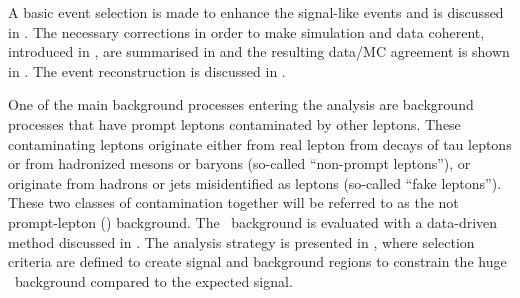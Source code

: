  A basic event selection is made to enhance the signal-like events and is discussed in . The necessary  corrections in order to make simulation and data coherent, introduced in , are summarised in  and the resulting data/MC agreement is shown in . The event reconstruction is discussed in . 
 
 One of the main background processes entering the analysis are background processes that have prompt leptons contaminated by other leptons. These contaminating leptons originate either from real lepton from decays of tau leptons or from hadronized mesons or baryons
 (so-called ``non-prompt leptons''), or originate from hadrons or jets misidentified as leptons (so-called ``fake leptons'').  These two classes  of contamination together will be referred to as the not prompt-lepton (\NPL) background. The \NPL\ background  is
 evaluated with a data-driven method discussed in . The analysis strategy is presented in , where selection criteria are defined to create signal and background regions to constrain the huge \SM\ background compared to the expected signal. %


